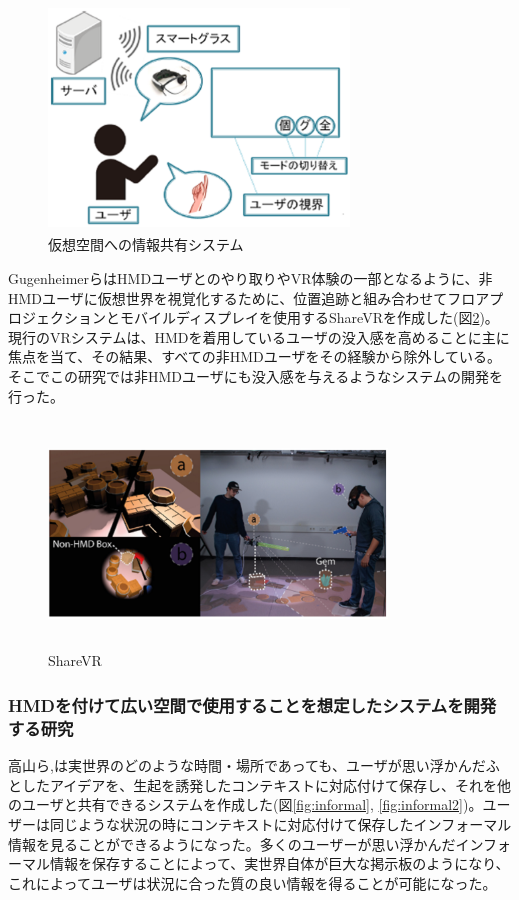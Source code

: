 \documentclass[11pt,a4j, titlepage]{jarticle} %
\begin{document}
\begin{figure}[H]
  \begin{center}
    \includegraphics[clip,height=6.0cm,width=8.0cm]{./kasoukuukan.eps}
    \caption{仮想空間への情報共有システム}
    \label{fig:kasoukuukan}
  \end{center}
\end{figure}

Gugenheimerら\cite{Gugenheimer}はHMDユーザとのやり取りやVR体験の一部となるように、非HMDユーザに仮想世界を視覚化するために、位置追跡と組み合わせてフロアプロジェクションとモバイルディスプレイを使用するShareVRを作成した(図\ref{fig:sharevr})。現行のVRシステムは、HMDを着用しているユーザの没入感を高めることに主に焦点を当て、その結果、すべての非HMDユーザをその経験から除外している。そこでこの研究では非HMDユーザにも没入感を与えるようなシステムの開発を行った。

\begin{figure}[H]
  \begin{center}
    \includegraphics[clip,height=6.0cm,width=9.0cm]{./sharevr.eps}
    \caption{ShareVR}
    \label{fig:sharevr}
  \end{center}
\end{figure}

\subsubsection{HMDを付けて広い空間で使用することを想定したシステムを開発する研究}
高山ら\cite{tano},\cite{tano2}は実世界のどのような時間・場所であっても、ユーザが思い浮かんだふとしたアイデアを、生起を誘発したコンテキストに対応付けて保存し、それを他のユーザと共有できるシステムを作成した(図\ref{fig:informal}, \ref{fig:informal2})。ユーザーは同じような状況の時にコンテキストに対応付けて保存したインフォーマル情報を見ることができるようになった。多くのユーザーが思い浮かんだインフォーマル情報を保存することによって、実世界自体が巨大な掲示板のようになり、これによってユーザは状況に合った質の良い情報を得ることが可能になった。
\end{document}
